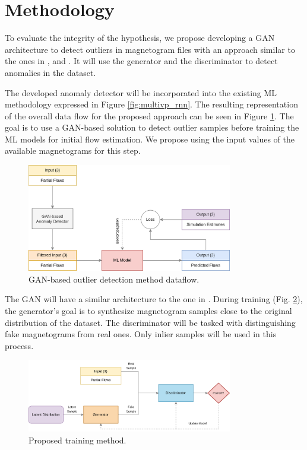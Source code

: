 \section{Methodology}\label{sec:method}
To evaluate the integrity of the hypothesis, we propose developing a GAN architecture to detect outliers in magnetogram files with an approach similar to the ones in \cite{li.etal_MADGANMultivariateAnomaly_2019}, and \cite{bashar.nayak_TAnoGANTimeSeries_2020}. It will use the generator and the discriminator to detect anomalies in the dataset. 

The developed anomaly detector will be incorporated into the existing ML methodology expressed in Figure \ref{fig:multivp_rnn}. The resulting representation of the overall data flow for the proposed approach can be seen in Figure \ref{fig:gan_rnn_multivp}. The goal is to use a GAN-based solution to detect outlier samples before training the ML models for initial flow estimation. We propose using the input values of the available magnetograms for this step.

\begin{figure}[ht]
\centering
\includegraphics[width=0.8\textwidth]{figures/gan_rnn_multivp.png}
\caption{GAN-based outlier detection method dataflow.}
\label{fig:gan_rnn_multivp}
\end{figure}

The GAN will have a similar architecture to the one in \cite{goodfellow.etal_GenerativeAdversarialNets_}. During training (Fig. \ref*{fig:proposed_gan_train}), the generator's goal is to synthesize magnetogram samples close to the original distribution of the dataset. The discriminator will be tasked with distinguishing fake magnetograms from real ones. Only inlier samples will be used in this process.

\begin{figure}[ht]
    \centering
    \includegraphics[width=0.8\textwidth]{figures/gan_arch_train.png}
    \caption{Proposed training method.}
    \label{fig:proposed_gan_train}
\end{figure}

